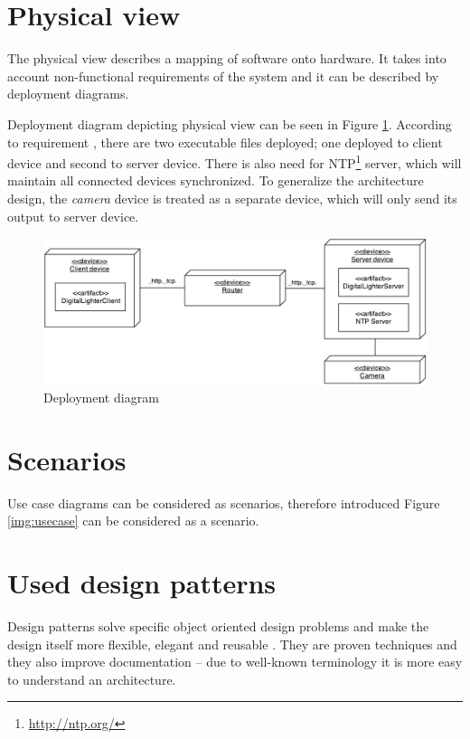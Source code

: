 \section{Physical view}
The physical view \cite{Kruchten:1995:VMA:624610.625529} describes a mapping of software onto hardware. 
It takes into account non-functional requirements of the system and it can be described by deployment diagrams.

Deployment diagram depicting physical view can be seen in Figure \ref{fig:architecture_deployment_diagram}.
According to requirement , there are two executable files deployed; one deployed to client device and second to server device.
There is also need for NTP\footnote{\url{http://ntp.org/}} server, which will maintain all connected devices synchronized.
To generalize the architecture design, the \emph{camera} device is treated as a separate device, which will only send its output to server device.

\begin{figure}[h]
	\centering
		\includegraphics[width=15cm]{softwareArchitecture/deployment-diagram.pdf}
	\caption{Deployment diagram}
	\label{fig:architecture_deployment_diagram}
\end{figure}

\section{Scenarios}
Use case diagrams can be considered as scenarios, therefore introduced Figure \ref{img:usecase} can be considered as a scenario.

\section{Used design patterns}
Design patterns solve specific object oriented design problems and make the design itself more flexible, elegant and reusable \cite[p.~11]{Gamma:1995:DPE:186897}.
They are proven techniques and they also improve documentation -- due to well-known terminology it is more easy to understand an architecture.

